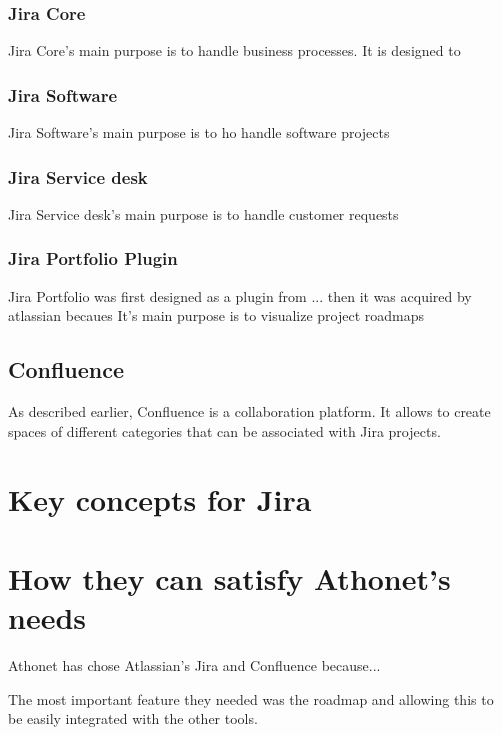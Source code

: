 		\subsubsection{Jira Core}
			Jira Core's main purpose is to handle business processes. 
			It is designed to
			
		\subsubsection{Jira Software}
			Jira Software's main purpose is to ho handle software projects
		
		\subsubsection{Jira Service desk}
			Jira Service desk's main purpose is to handle customer requests

		\subsubsection{Jira Portfolio Plugin}
			Jira Portfolio was first designed as a plugin from ... then it was acquired by atlassian becaues
			It's main purpose is to visualize project roadmaps
		
	\subsection{Confluence}
		As described earlier, Confluence is a collaboration platform.
		It allows to create spaces of different categories that can be associated with Jira projects.

\section{Key concepts for Jira}

\section{How they can satisfy Athonet's needs}

	Athonet has chose Atlassian's Jira and Confluence because... 

	The most important feature they needed was the roadmap and allowing this to be easily integrated with the other tools.
	
